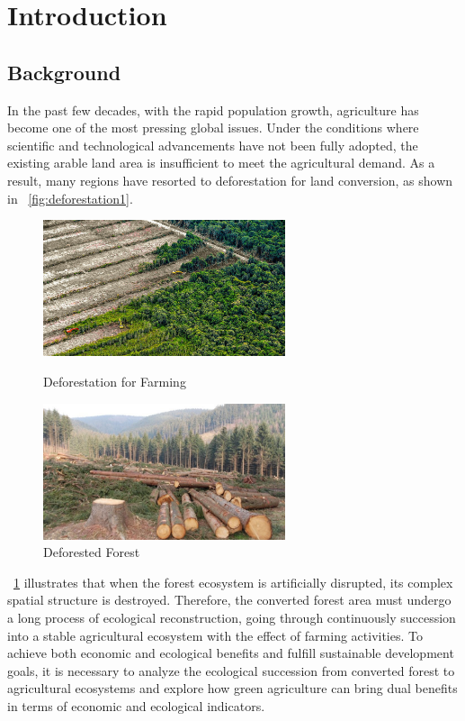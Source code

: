 \documentclass{HZNUMCM}
\begin{document}
\showSummarySheet
\newpage %
\showContents
  \section{Introduction}
    \subsection{Background}
    In the past few decades, with the rapid population growth, 
    agriculture has become one of the most pressing global issues. 
    Under the conditions where scientific and technological advancements have not been fully adopted, 
    the existing arable land area is insufficient to meet the agricultural demand. 
    As a result, many regions have resorted to deforestation for land conversion, 
    as shown in \figurename~\ref{fig:deforestation1}. 
    \begin{figure}[H]
      \centering
        \begin{minipage}[b]{0.45\linewidth}
            \centering
            \includegraphics[height=4cm, keepaspectratio]{images/deforestation1.jpg} %
            \caption{Deforestation for Farming}
            \label{fig:deforestation1}
        \end{minipage}
      \hspace{0.05\linewidth}
        \begin{minipage}[b]{0.45\linewidth}
            \centering
            \includegraphics[height=4cm, keepaspectratio]{images/deforestation2.jpg} %
            \caption{Deforested Forest}
            \label{fig:deforestation2}
        \end{minipage}
      \end{figure}
    \figurename~\ref{fig:deforestation2} illustrates that when the forest ecosystem is artificially disrupted, 
    its complex spatial structure is destroyed.
    Therefore, the converted forest area must undergo a long process of ecological reconstruction, going through continuously succession into a stable agricultural ecosystem with the effect of farming activities. To achieve both economic and ecological benefits and fulfill sustainable development goals, it is necessary to analyze the ecological succession from converted forest to agricultural ecosystems and explore how green agriculture can bring dual benefits in terms of economic and ecological indicators.
\end{document}
